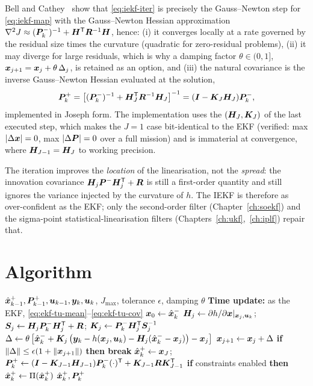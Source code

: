 Bell and Cathey~\cite{bellcathey1993} show that \eqref{eq:iekf-iter} is precisely the
Gauss--Newton step for \eqref{eq:iekf-map} with the Gauss--Newton Hessian approximation
$\nabla^2 J \approx (\bm{P}^{-}_k)^{-1} + \bm{H}^{\mathsf{T}}\bm{R}^{-1}\bm{H}$, hence: (i) it converges locally at a
rate governed by the residual size times the curvature (quadratic for zero-residual
problems), (ii) it may diverge for large residuals, which is why a damping factor
$\theta\in(0,1]$, $\bm{x}_{j+1} = \bm{x}_j + \theta\,\Delta_j$, is retained as an option, and
(iii) the natural covariance is the inverse Gauss--Newton Hessian evaluated at the solution,
\begin{equation}
\bm{P}^{+}_k = \left[(\bm{P}^{-}_k)^{-1} + \bm{H}_J^{\mathsf{T}}\bm{R}^{-1}\bm{H}_J\right]^{-1}
 = (\bm{I} - \bm{K}_J\bm{H}_J)\bm{P}^{-}_k,
\label{eq:iekf-cov}
\end{equation}
implemented in Joseph form. The implementation uses the $(\bm{H}_J,\bm{K}_J)$ of the last executed
step, which makes the $J=1$ case bit-identical to the EKF (verified: max
$\left\lvert \Delta\bm{x} \right\rvert=0$, max $\left\lvert \Delta\bm{P} \right\rvert=0$ over a full mission) and is immaterial at
convergence, where $\bm{H}_{J-1}=\bm{H}_J$ to working precision.

\begin{remark}
The iteration improves the \emph{location} of the linearisation, not the \emph{spread}: the
innovation covariance $\bm{H}_j\bm{P}^{-}\bm{H}_j^{\mathsf{T}}+\bm{R}$ is still a first-order quantity and still
ignores the variance injected by the curvature of $h$. The IEKF is therefore as
over-confident as the EKF; only the second-order filter (Chapter~\ref{ch:soekf}) and the
sigma-point statistical-linearisation filters (Chapters~\ref{ch:ukf},~\ref{ch:iplf}) repair
that.
\end{remark}

\section{Algorithm}
\begin{algorithm}[H]
\caption{IEKF --- one sampling period}
\begin{algorithmic}[1]
\Require $\hat{\bm{x}}^{+}_{k-1},\bm{P}^{+}_{k-1},\bm{u}_{k-1},\bm{y}_k,\bm{u}_k$, $J_{\max}$, tolerance $\epsilon$, damping $\theta$
\State \textbf{Time update:} as the EKF, \eqref{eq:ekf-tu-mean}--\eqref{eq:ekf-tu-cov}
\State $\bm{x}_0 \gets \hat{\bm{x}}^{-}_k$
  \State $\bm{H}_j \gets \partial h/\partial\bm{x}|_{\bm{x}_j,\bm{u}_k}$; \;
         $\bm{S}_j \gets \bm{H}_j\bm{P}^{-}_k\bm{H}_j^{\mathsf{T}}+\bm{R}$; \;
         $\bm{K}_j \gets \bm{P}^{-}_k\bm{H}_j^{\mathsf{T}}\bm{S}_j^{-1}$
  \State $\Delta \gets \theta\left[\hat{\bm{x}}^{-}_k + \bm{K}_j\left(\bm{y}_k - h(\bm{x}_j,\bm{u}_k) - \bm{H}_j(\hat{\bm{x}}^{-}_k-\bm{x}_j)\right) - \bm{x}_j\right]$
  \State $\bm{x}_{j+1}\gets\bm{x}_j+\Delta$
  \State \textbf{if} $\left\lVert \Delta \right\rVert\le\epsilon(1+\left\lVert \bm{x}_{j+1} \right\rVert)$ \textbf{then break}
\EndFor
\State $\hat{\bm{x}}^{+}_k \gets \bm{x}_{J}$; \;
       $\bm{P}^{+}_k \gets (\bm{I}-\bm{K}_{J-1}\bm{H}_{J-1})\bm{P}^{-}_k(\cdot)^{\mathsf{T}} + \bm{K}_{J-1}\bm{R}\bm{K}_{J-1}^{\mathsf{T}}$
\State \textbf{if} constraints enabled \textbf{then} $\hat{\bm{x}}^{+}_k\gets\Pi(\hat{\bm{x}}^{+}_k)$
\Ensure $\hat{\bm{x}}^{+}_k,\bm{P}^{+}_k$
\end{algorithmic}
\end{algorithm}

